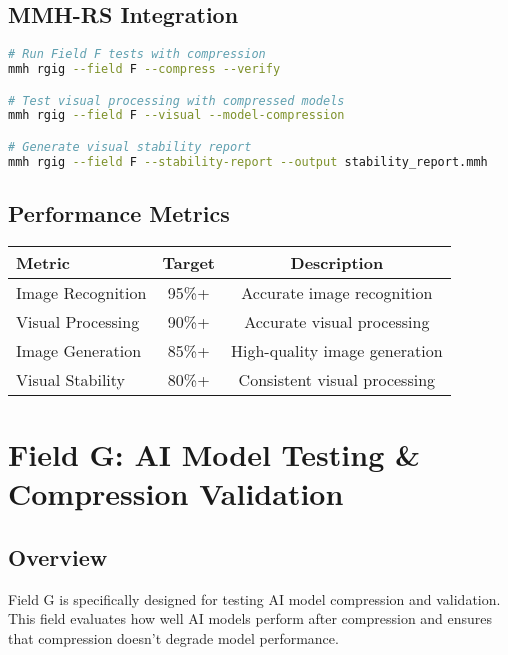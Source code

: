 \documentclass[12pt,a4paper]{article}
\begin{document}
\subsection{MMH-RS Integration}
\begin{lstlisting}[language=bash, caption=Field F Testing with MMH-RS]
# Run Field F tests with compression
mmh rgig --field F --compress --verify

# Test visual processing with compressed models
mmh rgig --field F --visual --model-compression

# Generate visual stability report
mmh rgig --field F --stability-report --output stability_report.mmh
\end{lstlisting}

\subsection{Performance Metrics}
\begin{center}
\begin{tabular}{|l|c|c|}
\hline
\textbf{Metric} & \textbf{Target} & \textbf{Description} \\
\hline
Image Recognition & 95\%+ & Accurate image recognition \\
Visual Processing & 90\%+ & Accurate visual processing \\
Image Generation & 85\%+ & High-quality image generation \\
Visual Stability & 80\%+ & Consistent visual processing \\
\hline
\end{tabular}
\end{center}

\newpage

\section{Field G: AI Model Testing \& Compression Validation}

\subsection{Overview}
Field G is specifically designed for testing AI model compression and validation. This field evaluates how well AI models perform after compression and ensures that compression doesn't degrade model performance.
\end{document}
